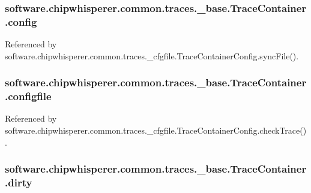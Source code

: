 \subsubsection[{config}]{\setlength{\rightskip}{0pt plus 5cm}software.\+chipwhisperer.\+common.\+traces.\+\_\+base.\+Trace\+Container.\+config}\label{classsoftware_1_1chipwhisperer_1_1common_1_1traces_1_1__base_1_1TraceContainer_a91b28c5692513860c2c5a6f920958ede}


Referenced by software.\+chipwhisperer.\+common.\+traces.\+\_\+cfgfile.\+Trace\+Container\+Config.\+sync\+File().

\hypertarget{classsoftware_1_1chipwhisperer_1_1common_1_1traces_1_1__base_1_1TraceContainer_a9dbd1f233cc1555571efa0aada83f863}{}
\subsubsection[{configfile}]{\setlength{\rightskip}{0pt plus 5cm}software.\+chipwhisperer.\+common.\+traces.\+\_\+base.\+Trace\+Container.\+configfile}\label{classsoftware_1_1chipwhisperer_1_1common_1_1traces_1_1__base_1_1TraceContainer_a9dbd1f233cc1555571efa0aada83f863}


Referenced by software.\+chipwhisperer.\+common.\+traces.\+\_\+cfgfile.\+Trace\+Container\+Config.\+check\+Trace().

\hypertarget{classsoftware_1_1chipwhisperer_1_1common_1_1traces_1_1__base_1_1TraceContainer_a5829014f02d4f6aff1dfc8a234189641}{}
\subsubsection[{dirty}]{\setlength{\rightskip}{0pt plus 5cm}software.\+chipwhisperer.\+common.\+traces.\+\_\+base.\+Trace\+Container.\+dirty}\label{classsoftware_1_1chipwhisperer_1_1common_1_1traces_1_1__base_1_1TraceContainer_a5829014f02d4f6aff1dfc8a234189641}


